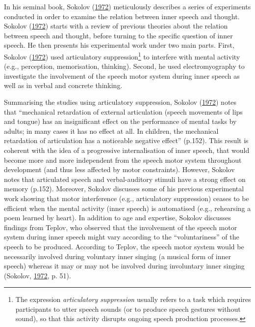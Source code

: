 \documentclass[a4paper,12pt,twoside,openright,oldfontcommands]{memoir}
\let\rmarkdownfootnote\footnote%
\def\footnote{\protect\rmarkdownfootnote}
\begin{document}
In his seminal book, Sokolov (\protect\hyperlink{ref-sokolov_inner_1972}{1972}) meticulously describes a series of experiments conducted in order to examine the relation between inner speech and thought. Sokolov (\protect\hyperlink{ref-sokolov_inner_1972}{1972}) starts with a review of previous theories about the relation between speech and thought, before turning to the specific question of inner speech. He then presents his experimental work under two main parts. First, Sokolov (\protect\hyperlink{ref-sokolov_inner_1972}{1972}) used articulatory suppression\footnote{The expression \emph{articulatory suppression} usually refers to a task which requires participants to utter speech sounds (or to produce speech gestures without sound), so that this activity disrupts ongoing speech production processes.} to interfere with mental activity (e.g., perception, memorisation, thinking). Second, he used electromyography to investigate the involvement of the speech motor system during inner speech as well as in verbal and concrete thinking.

Summarising the studies using articulatory suppression, Sokolov (\protect\hyperlink{ref-sokolov_inner_1972}{1972}) notes that \enquote{mechanical retardation of external articulation (speech movements of lips and tongue) has an insignificant effect on the performance of mental tasks by adults; in many cases it has no effect at all. In children, the mechanical retardation of articulation has a noticeable negative effect} (p.152). This result is coherent with the idea of a progressive internalisation of inner speech, that would become more and more independent from the speech motor system throughout development (and thus less affected by motor constraints). However, Sokolov notes that articulated speech and verbal-auditory stimuli have a strong effect on memory (p.152). Moreover, Sokolov discusses some of his previous experimental work showing that motor interference (e.g., articulatory suppression) ceases to be efficient when the mental activity (inner speech) is automatised (e.g., rehearsing a poem learned by heart). In addition to age and expertise, Sokolov discusses findings from Teplov, who observed that the involvement of the speech motor system during inner speech might vary according to the \enquote{voluntariness} of the speech to be produced. According to Teplov, the speech motor system would be necessarily involved during voluntary inner singing (a musical form of inner speech) whereas it may or may not be involved during involuntary inner singing (Sokolov, \protect\hyperlink{ref-sokolov_inner_1972}{1972}, p. 51).
\end{document}
